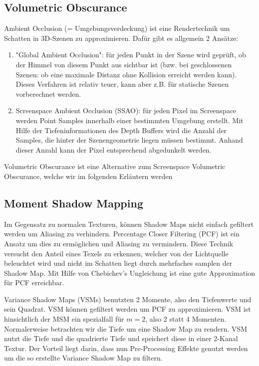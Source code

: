 \documentclass[runningheaders,a4paper]{llncs}
\begin{document}
\subsection{Volumetric Obscurance}

Ambient Occlusion (= Umgebungsverdeckung) ist eine Rendertechnik um Schatten in 3D-Szenen
zu approximieren. Dafür gibt es allgemein 2 Ansätze:
\begin{enumerate}
	\item "Global Ambient Occlusion": für jeden Punkt in der Szene wird geprüft, ob der Himmel von diesem
		Punkt aus sichtbar ist (bzw. bei geschlossenen Szenen: ob eine maximale Distanz ohne Kollision erreicht
		 werden kann). Dieses Verfahren ist relativ teuer, kann aber z.B. für statische Szenen vorberechnet
		 werden.
		\cite{aoPaper}
	\item Screenspace Ambient Occlusion (SSAO): für jeden Pixel im Screenspace werden Point Samples
		innerhalb einer bestimmten Umgebung erstellt. Mit Hilfe der Tiefeninformationen des Depth Buffers
		wird die Anzahl der Samples, die hinter der Szenengeometrie liegen müssen bestimmt. Anhand dieser Anzahl
		kann der Pixel entsprechend abgedunkelt werden.  \cite{cry2Paper}
\end{enumerate}  
Volumetric Obscurance ist eine Alternative zum Screenspace Volumetric Obscurance, welche wir im folgenden
Erläutern werden

\cite{loos2010volumetric}

\subsection{Moment Shadow Mapping}

Im Gegensatz zu normalen Texturen, können Shadow Maps nicht einfach gefiltert werden um Aliasing zu verhindern. 
Percentage Closer Filtering (PCF) ist ein Ansatz um dies zu ermöglichen und Aliasing zu vermindern. Diese Technik versucht den Anteil eines Texels zu erkennen, welcher von der Lichtquelle beleuchtet wird und nicht im Schatten liegt durch mehrfaches samplen der Shadow Map. 
Mit Hilfe von Chebichev's Ungleichung ist eine gute Approximation für PCF erreichbar. \cite{reeves1987rendering}

Variance Shadow Maps (VSMs) benutzten 2 Momente, also den Tiefenwerte und sein Quadrat.
VSM können gefiltert werden um PCF zu approximieren.
VSM ist hinsichtlich der MSM ein spezialfall für $m = 2$, also 2 statt 4 Momenten. Normalerweise betrachten wir die Tiefe um eine Shadow Map zu rendern. VSM nutzt die Tiefe und die quadrierte Tiefe und speichert diese in einer 2-Kanal Textur. Der Vorteil liegt darin, dass nun Pre-Processing Effekte genutzt werden um die so erstellte Variance Shadow Map zu filtern. \cite{donnelly2006variance}
\end{document}

